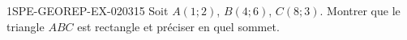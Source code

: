 \begin{exercice}{1SPE-GEOREP-EX-020}{3}{15}
Soit $A(1 ; 2)$, $B(4 ; 6)$, $C(8 ; 3)$. Montrer que le triangle $ABC$ est rectangle et préciser en quel sommet.
\end{exercice}
